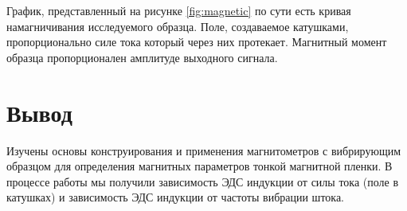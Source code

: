 \documentclass[a4paper, 12pt]{extarticle}
\begin{document}
График, представленный на рисунке \ref{fig:magnetic} по сути есть кривая намагничивания исследуемого образца. Поле, создаваемое катушками, пропорционально силе тока который через них протекает. Магнитный момент образца пропорционален амплитуде выходного сигнала.

\section*{\textcolor{header}{Вывод}}


Изучены основы конструирования и применения магнитометров с вибрирующим
образцом для определения магнитных параметров тонкой магнитной пленки. В процессе
работы мы получили зависимость ЭДС индукции от силы тока (поле в катушках) и
зависимость ЭДС индукции от частоты вибрации штока.
\end{document}
